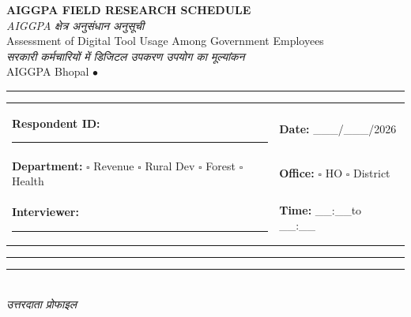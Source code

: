 \documentclass[10pt,a4paper]{article}
\newcommand{\blank}{\rule{7cm}{0.4pt}}
\begin{document}
\begin{center}
{\Large\bfseries AIGGPA FIELD RESEARCH SCHEDULE}\\[1pt]
{\large\hindifont\itshape\color{black!70} AIGGPA \textnormal{क्षेत्र अनुसंधान अनुसूची}}\\[6pt]
{\small Assessment of Digital Tool Usage Among Government Employees}\\[1pt]
{\small\hindifont\itshape\color{black!70} सरकारी कर्मचारियों में डिजिटल उपकरण उपयोग का मूल्यांकन}\\[4pt]
{\small AIGGPA Bhopal \quad$\bullet$}
\end{center}
\vspace{4pt}\noindent\rule{\textwidth}{1pt}\vspace{4pt}

\noindent\begin{tabularx}{\textwidth}{@{}L{9.5cm} X@{}}
\textbf{Respondent ID:} \blank & \textbf{Date:} \_\_\_/\_\_\_/2026 \\[6pt]
\textbf{Department:} {\Large$\square$} Revenue {\Large$\square$} Rural Dev {\Large$\square$} Forest {\Large$\square$} Health & \textbf{Office:} {\Large$\square$} HO {\Large$\square$} District \\[6pt]
\textbf{Interviewer:} \blank & \textbf{Time:} \_\_:\_\_\quad to \quad\_\_:\_\_ \\
\end{tabularx}
\vspace{4pt}\noindent\rule{\textwidth}{0.5pt}\vspace{4pt}
\noindent\rule{\textwidth}{0.3pt}\vspace{3pt}
\\
{\hindifont\itshape\color{black!70} उत्तरदाता प्रोफाइल}\vspace{3pt}
\end{document}

